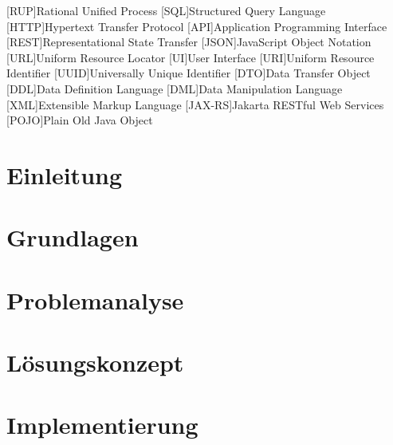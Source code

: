 \documentclass[oneside]{ausarbeitung}
\begin{document}
\listofabbreviations
\begin{acronym}[Bsp.]  %

[RUP]{Rational Unified Process}
[SQL]{Structured Query Language}
[HTTP]{Hypertext Transfer Protocol}
[API]{Application Programming Interface}
[REST]{Representational State Transfer}
[JSON]{JavaScript Object Notation}
[URL]{Uniform Resource Locator}
[UI]{User Interface}   
[URI]{Uniform Resource Identifier}
[UUID]{Universally Unique Identifier}
[DTO]{Data Transfer Object}
[DDL]{Data Definition Language}
[DML]{Data Manipulation Language}
[XML]{Extensible Markup Language}
[JAX-RS]{Jakarta RESTful Web Services}
[POJO]{Plain Old Java Object}
\end{acronym}


\cleardoublepage
{}
\setcounter{page}{1}

\chapter{Einleitung}
\label{cha:einleitung}


\chapter{Grundlagen}
\label{cha:grundlagen}


\chapter{Problemanalyse}
\label{cha:problemanalyse}


\chapter{Lösungskonzept}
\label{cha:loesungskonzept}


\chapter{Implementierung}
\label{cha:implementierung}

\end{document}
